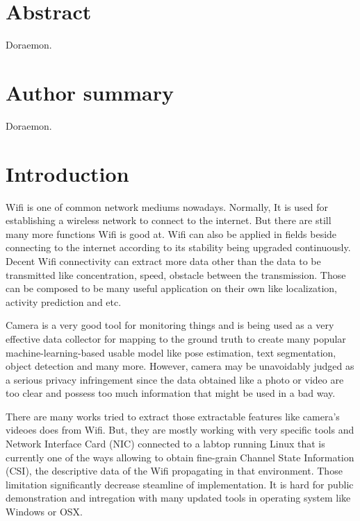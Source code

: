 \documentclass[10pt,letterpaper]{article}
\begin{document}
\section*{Abstract}
Doraemon.

\section*{Author summary}
Doraemon.

\linenumbers

\section*{Introduction}
 Wifi is one of common network mediums nowadays. Normally, It is used for establishing a wireless network to connect to the internet. But there are still many more functions Wifi is good at. Wifi can also be applied in fields beside connecting to the internet according to its stability being upgraded continuously. Decent Wifi connectivity can extract more data other than the data to be transmitted like concentration, speed, obstacle between the transmission. Those can be composed to be many useful application on their own like localization, activity prediction and  etc.


Camera is a very good tool for monitoring things and is being used as a very effective data collector for mapping to the ground truth to create many popular machine-learning-based usable model like pose estimation, text segmentation, object detection and many  more. However, camera may be unavoidably judged as a serious privacy infringement since the data obtained like a photo or video are too clear and possess too much information that might be used in a bad way.


There are many works tried to extract those extractable features like camera's videoes does from Wifi. But, they are mostly working with very specific tools and Network Interface Card (NIC) connected to a labtop running Linux that is currently one of the ways allowing to obtain fine-grain Channel State Information (CSI), the descriptive data of the  Wifi propagating in that environment. Those limitation significantly decrease steamline of implementation. It is hard for public demonstration and intregation with many updated tools in operating system like Windows or OSX.
\end{document}
